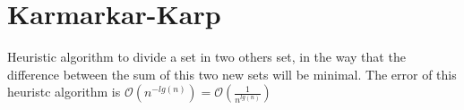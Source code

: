\section{Karmarkar-Karp}
    Heuristic algorithm to divide a set in two others set, in the way that the difference between the sum of this two new sets will be minimal.
    The error of this heuristc algorithm is $\mathcal{O}(n^{-lg(n)})=\mathcal{O}(\frac{1}{n^{lg(n)}})$
